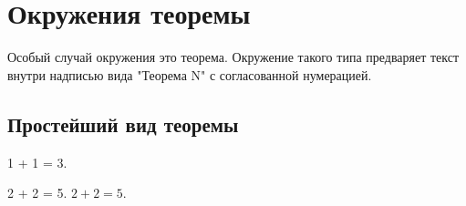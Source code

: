     
    \section{ \centering Окружения теоремы}
        Особый случай окружения это теорема. Окружение такого типа предваряет текст внутри надписью вида "Теорема N" с согласованной нумерацией.
        
        \subsection{Простейший вид теоремы}
            \begin{lemma}
                1 + 1 = 3.
            \end{lemma}
            \begin{theorem}
                2 + 2 = 5.
                $2 + 2 = 5$.
            \end{theorem}

